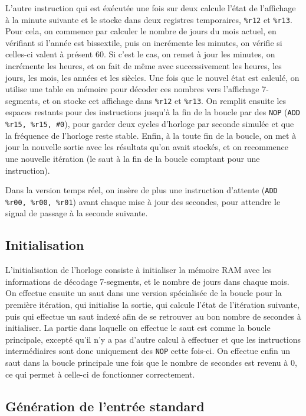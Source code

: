 \documentclass[11pt,a4paper]{article}
\newcommand{\acronym}[1]{\MakeUppercase{#1}}
\newcommand{\relire}{}
\newcommand{\relu}[1]{}
\begin{document}
L'autre instruction qui est éxécutée une fois sur deux calcule l'état
de l'affichage à la minute suivante et le stocke dans deux registres
temporaires, \verb!%r12! et \verb!%r13!. Pour cela, on commence par
calculer le nombre de jours du mois actuel, en vérifiant si l'année
est bissextile, puis on incrémente les minutes, on vérifie si
celles-ci valent à présent 60. Si c'est le cas, on remet à jour les
minutes, on incrémente les heures, et on fait de même avec
successivement les heures, les jours, les mois, les années et les
siècles. Une fois que le nouvel état est calculé, on utilise une table
en mémoire pour décoder ces nombres vers l'affichage 7-segments, et on
stocke cet affichage dans \verb!%r12! et \verb!%r13!. On remplit
ensuite les espaces restants pour des instructions jusqu'à la fin de
la boucle par des \verb!NOP! (\verb!ADD %r15, %r15, #0!), pour garder
deux cycles d'horloge par seconde simulée et que la fréquence de
l'horloge reste stable. Enfin, à la toute fin de la boucle, on met à
jour la nouvelle sortie avec les résultats qu'on avait stockés, et on
recommence une nouvelle itération (le saut à la fin de la boucle
comptant pour une instruction).

Dans la version temps réel, on insère de plus une instruction
d'attente (\verb!ADD %r00, %r00, %r01!) avant chaque mise à jour des
secondes, pour attendre le signal de passage à la seconde suivante.

\subsection{Initialisation}

L'initialisation de l'horloge consiste à initialiser la mémoire
\acronym{ram} avec les informations de décodage 7-segments, et le
nombre de jours dans chaque mois. On effectue ensuite un saut dans une
version spécialisée de la boucle pour la première itération, qui
initialise la sortie, qui calcule l'état de l'itération suivante, puis
qui effectue un saut indexé afin de se retrouver au bon nombre de
secondes à initialiser. La partie dans laquelle on effectue le saut
est comme la boucle principale, excepté qu'il n'y a pas d'autre calcul
à effectuer et que les instructions intermédiaires sont donc
uniquement des \verb!NOP! cette fois-ci. On effectue enfin un saut
dans la boucle principale une fois que le nombre de secondes est
revenu à 0, ce qui permet à celle-ci de fonctionner correctement.

\subsection{Génération de l'entrée standard}
\relire  \relu{Théo}
\end{document}
